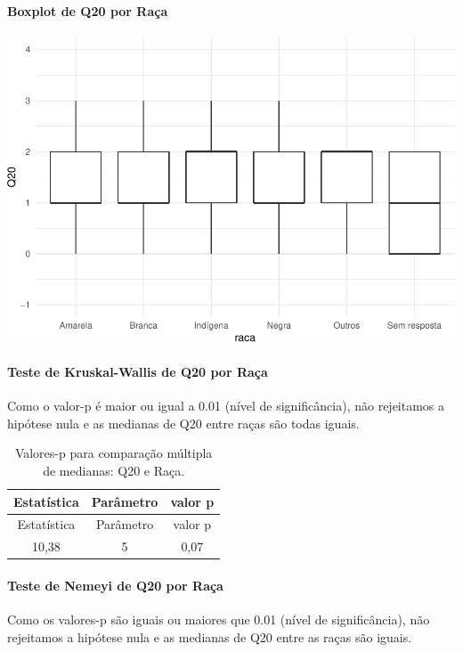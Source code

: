 \documentclass[]{article}
\let\oldparagraph\paragraph
\renewcommand{\paragraph}[1]{\oldparagraph{#1}\mbox{}}
\begin{document}
\hypertarget{boxplot-de-q20-por-rauxe7a}{%
\paragraph{Boxplot de Q20 por Raça}\label{boxplot-de-q20-por-rauxe7a}}

\begin{center}\includegraphics[width=0.75\linewidth]{relatorio_covid19_files/figure-latex/unnamed-chunk-401-1} \end{center}

\hypertarget{teste-de-kruskal-wallis-de-q20-por-rauxe7a}{%
\paragraph{Teste de Kruskal-Wallis de Q20 por Raça}\label{teste-de-kruskal-wallis-de-q20-por-rauxe7a}}

Como o valor-p é maior ou igual a 0.01 (nível de significância), não rejeitamos a hipótese nula e as medianas de Q20 entre raças são todas iguais.

\begin{longtable}[]{@{}ccc@{}}
\caption{\label{tab:unnamed-chunk-403}Valores-p para comparação múltipla de medianas: Q20 e Raça.}\tabularnewline
\toprule
Estatística & Parâmetro & valor p\tabularnewline
\midrule
\endfirsthead
\toprule
Estatística & Parâmetro & valor p\tabularnewline
\midrule
\endhead
10,38 & 5 & 0,07\tabularnewline
\bottomrule
\end{longtable}

\hypertarget{teste-de-nemeyi-de-q20-por-rauxe7a}{%
\paragraph{Teste de Nemeyi de Q20 por Raça}\label{teste-de-nemeyi-de-q20-por-rauxe7a}}

Como os valores-p são iguais ou maiores que 0.01 (nível de significância), não rejeitamos a hipótese nula e as medianas de Q20 entre as raças são iguais.
\end{document}
